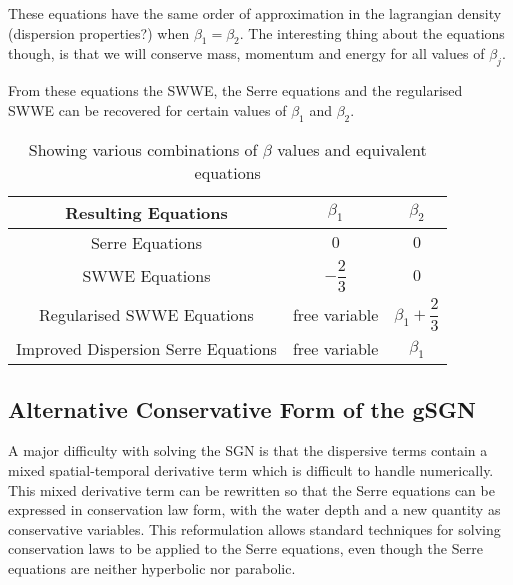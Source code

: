 \documentclass[10pt]{article}
\begin{document}
These equations have the same order of approximation in the lagrangian density (dispersion properties?) when $\beta_1 = \beta_2$. The interesting thing about the equations though, is that we will conserve mass, momentum and energy for all values of $\beta_j$. 

From these equations the SWWE, the Serre equations and the regularised SWWE \cite{Clamond-Dutykh-2018-237} can be recovered for certain values of $\beta_1$ and $\beta_2$. 


\begin{table}
	\centering
	\begin{tabular}{c | c | c}
		Resulting Equations &$\beta_1$ & $\beta_2$  \\
		\hline 
		Serre Equations & $0$ & $0$ \\
		SWWE Equations & $-\dfrac{2}{3}$ & $0$ \\
		Regularised SWWE Equations & free variable & $\beta_1 + \dfrac{2}{3}$  \\
		Improved Dispersion Serre Equations & free variable & $\beta_1$
	\end{tabular}
	\caption{Showing various combinations of $\beta$ values and equivalent equations}
\end{table}

\subsection{Alternative Conservative Form of the gSGN}

A major difficulty with solving the SGN is that the dispersive terms contain a mixed spatial-temporal derivative term which is difficult to handle numerically. This mixed derivative term can be rewritten  so that the Serre equations can be expressed in conservation law form, with the water depth and a new quantity as conservative variables. This reformulation allows standard techniques for solving conservation laws to be applied to the Serre equations, even though the Serre equations are neither hyperbolic nor parabolic.
\end{document}
